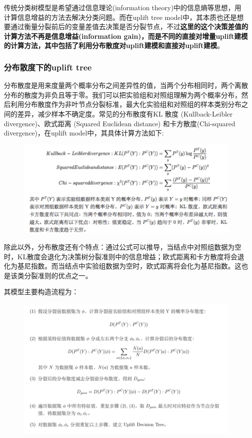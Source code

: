 \documentclass[12pt]{article}
\begin{document}
传统分类树模型是希望通过信息理论(information theory)中的信息熵等思想，用计算信息增益的方法去解决分类问题。而在uplift tree model中，其本质也还是想要通过衡量分裂前后的变量差值去决策是否分裂节点，不过\textbf{这里的这个决策差值的计算方法不再是信息增益(information gain)，而是不同的直接对增量uplift建模的计算方法，其中包括了利用分布散度对uplift建模和直接对uplift建模}。

\subsubsection{分布散度下的uplift tree}
分布散度是用来度量两个概率分布之间差异性的值，当两个分布相同时，两个离散分布的散度为非负且等于零。我们可以把实验组和对照组理解为两个概率分布，然后利用分布散度作为非叶节点分裂标准，最大化实验组和对照组的样本类别分布之间的差异，减少样本不确定度。常见的分布散度有KL 散度 (Kullback-Leibler divergence)、欧式距离 (Squared Euclidean distance) 和卡方散度(Chi-squared divergence)，在uplift model中，其具体计算方法如下:
\begin{figure}[H]
    \centering
    \includegraphics[width=1\textwidth]{fig/Causal_Inference_In_DiDi_12.png}
\end{figure}

除此以外，分布散度还有个特点：通过公式可以推导，当结点中对照组数据为空时，KL散度会退化为决策树分裂准则中的信息增益；欧式距离和卡方散度将会退化为基尼指数。而当结点中实验组数据为空时，欧式距离将会化为基尼指数。这也是该类分裂准则的优点之一。

其模型主要构造流程为：
\begin{figure}[H]
    \centering
    \includegraphics[width=1\textwidth]{fig/Causal_Inference_In_DiDi_13.png}
\end{figure}
\end{document}
